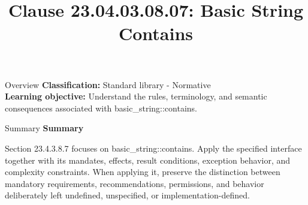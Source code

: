 \documentclass[10pt,letterpaper]{article}
\title{Clause 23.04.03.08.07: Basic String Contains}
\author{}
\date{}
\begin{document}
\maketitle
\begin{CornellOverviewBox}{Overview}
\textbf{Classification:} Standard library - Normative\\[2pt]
\textbf{Learning objective:} Understand the rules, terminology, and semantic consequences associated with basic\_string::contains.
\end{CornellOverviewBox}\begin{CornellSummaryBox}{Summary}
{\sffamily\bfseries\color{Accent} Summary}\par\vspace{3pt}Section 23.4.3.8.7 focuses on basic\_string::contains. Apply the specified interface together with its mandates, effects, result conditions, exception behavior, and complexity constraints. When applying it, preserve the distinction between mandatory requirements, recommendations, permissions, and behavior deliberately left undefined, unspecified, or implementation-defined.
\end{CornellSummaryBox}
\end{document}
